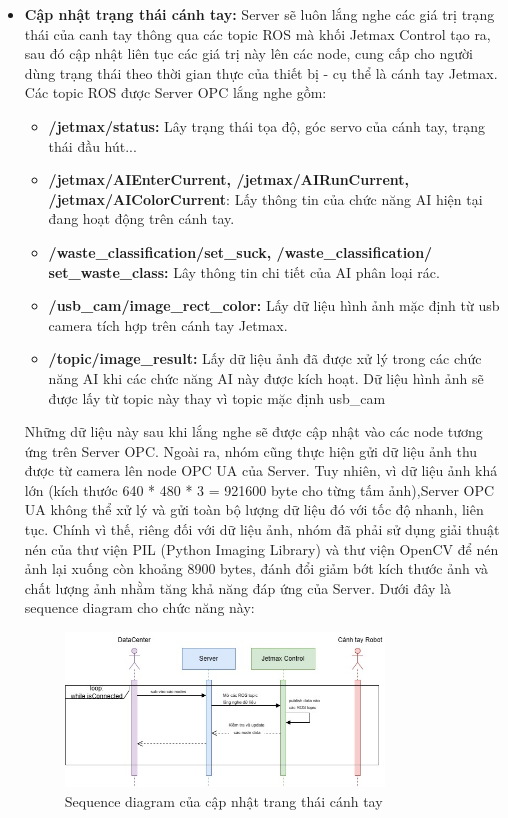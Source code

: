 \begin{itemize}
    \newpage
    
    \item \textbf{Cập nhật trạng thái cánh tay:} Server sẽ luôn lắng nghe các giá trị trạng thái của canh tay thông qua các topic ROS mà khối Jetmax Control tạo ra, sau đó cập nhật liên tục các giá trị này lên các node, cung cấp cho người dùng trạng thái theo thời gian thực của thiết bị - cụ thể là cánh tay Jetmax. Các topic ROS được Server OPC lắng nghe gồm:
    \begin{itemize}
        \item \textbf{/jetmax/status:} Lây trạng thái tọa độ, góc servo của cánh tay, trạng thái đầu hút...
        \item  \textbf{/jetmax/AIEnterCurrent, /jetmax/AIRunCurrent, /jetmax/AIColorCurrent}: Lấy thông tin của chức năng AI hiện tại đang hoạt động trên cánh tay.
        \item \textbf{/waste\_classification/set\_suck, /waste\_classification/\\
        set\_waste\_class:} Lây thông tin chi tiết của AI phân loại rác.
        \item \textbf{/usb\_cam/image\_rect\_color:} Lấy dữ liệu hình ảnh mặc định từ usb camera tích hợp trên cánh tay Jetmax. 
        \item \textbf{/{topic}/image\_result:} Lấy dữ liệu ảnh đã được xử lý trong các chức năng AI khi các chức năng AI này được kích hoạt. Dữ liệu hình ảnh sẽ được lấy từ topic này thay vì topic mặc định usb\_cam
    \end{itemize}
    Những dữ liệu này sau khi lắng nghe sẽ được cập nhật vào các node tương ứng trên Server OPC. Ngoài ra, nhóm cũng thực hiện gửi dữ liệu ảnh thu được từ camera lên node OPC UA của Server. Tuy nhiên, vì dữ liệu ảnh khá lớn (kích thước 640 * 480 * 3 = 921600 byte cho từng tấm ảnh),Server OPC UA không thể xử lý và gửi toàn bộ lượng dữ liệu đó với tốc độ nhanh, liên tục. Chính vì thế, riêng đối với dữ liệu ảnh, nhóm đã phải sử dụng giải thuật nén của thư viện PIL (Python Imaging Library) và thư viện OpenCV để nén ảnh lại xuống còn khoảng 8900 bytes, đánh đổi giảm bớt kích thước ảnh và chất lượng ảnh nhằm tăng khả năng đáp ứng của Server. Dưới đây là sequence diagram cho chức năng này: 
    \begin{figure}[!h]
        \centering
        \includegraphics[width=0.8\textwidth]{Images/Implementation/Control/update-state.jpg}
        \caption{Sequence diagram của cập nhật trang thái cánh tay}
    \end{figure}
\end{itemize}


